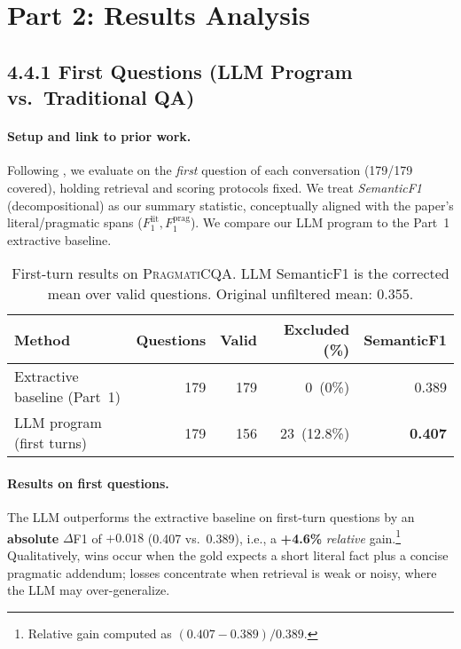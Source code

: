 \documentclass[12pt, letterpaper]{article}
\begin{document}
\clearpage
{}
{}
\section*{Part 2: Results Analysis}
\label{part2}
{}
\subsection*{4.4.1 First Questions (LLM Program vs.\ Traditional QA)}

\paragraph{Setup and link to prior work.}
Following \citet{pragmaticqa2023}, we evaluate on the \emph{first} question of each conversation (179/179 covered), holding retrieval and scoring protocols fixed. We treat \emph{SemanticF1} (decompositional) as our summary statistic, conceptually aligned with the paper’s literal/pragmatic spans (\(F^{\text{lit}}_1, F^{\text{prag}}_1\)). We compare our LLM program to the Part~1 extractive baseline.

\begin{table}[h]
\centering
\small
\begin{tabular}{lrrrr}
\toprule
\textbf{Method} & \textbf{Questions} & \textbf{Valid} & \textbf{Excluded (\%)} & \textbf{SemanticF1} \\
\midrule
Extractive baseline (Part~1) & 179 & 179 & 0 \,(0\%) & 0.389 \\
LLM program (first turns)    & 179 & 156 & 23 \,(12.8\%) & \textbf{0.407} \\
\bottomrule
\end{tabular}
\caption{First-turn results on \textsc{PragmatiCQA}. LLM SemanticF1 is the corrected mean over valid questions. Original unfiltered mean: 0.355.\footnotemark}
\label{tab:firstturn}
\end{table}

\paragraph{Results on first questions.}
The LLM outperforms the extractive baseline on first-turn questions by an \textbf{absolute} \(\Delta\)F1 of \(\mathbf{+0.018}\) (0.407 vs.\ 0.389), i.e., a \textbf{+4.6\%} \emph{relative} gain.\footnote{Relative gain computed as \((0.407-0.389)/0.389\).} Qualitatively, wins occur when the gold expects a short literal fact plus a concise pragmatic addendum; losses concentrate when retrieval is weak or noisy, where the LLM may over-generalize.
\end{document}
